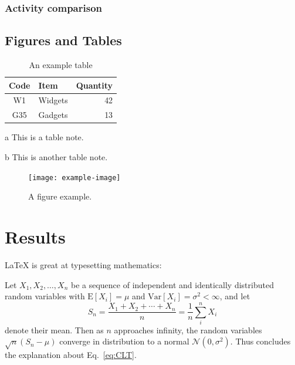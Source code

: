 \documentclass{biophys-new}
\begin{document}
\subsubsection{Activity comparison }

\subsection*{Figures and Tables}



\begin{table}[hbt!]
\caption{An example table}
\label{tab:widgets}
\centering

\begin{threeparttable}

\begin{tabular}{c l r}
\hline
Code & Item & Quantity \\\hline
W1 & Widgets\tnote{a} & 42 \\
G35 & Gadgets & 13\tnote{b} \\
\hline
\end{tabular}

\begin{tablenotes}
\item[a] This is a table note.
\item[b] This is another table note.
\end{tablenotes}

\end{threeparttable}

\end{table}

\begin{figure}[hbt!]
\centering
\texttt{[image: example-image]}
\caption{A figure example.}
\label{fig:view}

\end{figure}

\section*{Results}

\LaTeX{} is great at typesetting mathematics:

Let $X_1, X_2, \ldots, X_n$ be a sequence of independent and identically distributed random variables with $\text{E}[X_i] = \mu$ and $\text{Var}[X_i] = \sigma^2 < \infty$, and let
\begin{equation}
\label{eq:CLT}
S_n = \frac{X_1 + X_2 + \cdots + X_n}{n}
      = \frac{1}{n}\sum_{i}^{n} X_i
\end{equation}
denote their mean. Then as $n$ approaches infinity, the random variables $\sqrt{n}(S_n - \mu)$ converge in distribution to a normal $\mathcal{N}(0, \sigma^2)$. Thus concludes the explanation about Eq.~\ref{eq:CLT}.
\end{document}
